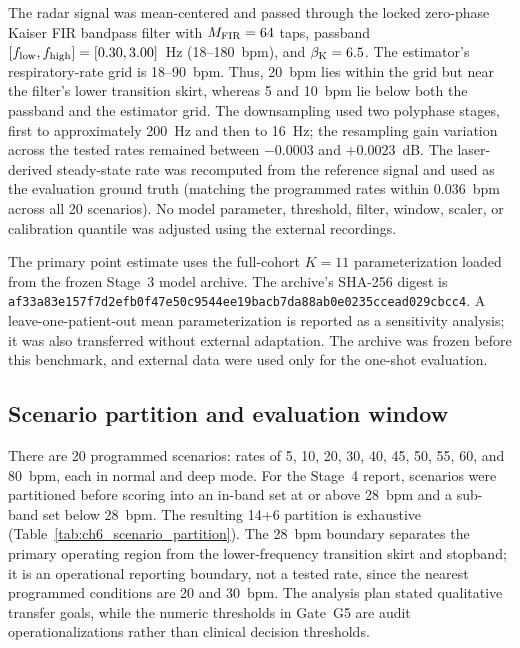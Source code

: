 The radar signal was mean-centered and passed through the locked zero-phase Kaiser FIR bandpass filter with $M_{\mathrm{FIR}}=64$ taps, passband $[f_{\mathrm{low}},f_{\mathrm{high}}]=[0.30,3.00]$~Hz (18--180~bpm), and $\beta_{\mathrm{K}}=6.5$. The estimator's respiratory-rate grid is 18--90~bpm. Thus, 20~bpm lies within the grid but near the filter's lower transition skirt, whereas 5 and 10~bpm lie below both the passband and the estimator grid. The downsampling used two polyphase stages, first to approximately 200~Hz and then to 16~Hz; the resampling gain variation across the tested rates remained between $-0.0003$ and $+0.0023$~dB. The laser-derived steady-state rate was recomputed from the reference signal and used as the evaluation ground truth (matching the programmed rates within 0.036~bpm across all 20 scenarios). No model parameter, threshold, filter, window, scaler, or calibration quantile was adjusted using the external recordings.

The primary point estimate uses the full-cohort $K=11$ parameterization loaded from the frozen Stage~3 model archive. The archive's SHA-256 digest is \texttt{af33a83e\allowbreak 157f7d2e\allowbreak fb0f47e5\allowbreak 0c9544ee\allowbreak 19bacb7d\allowbreak a88ab0e0\allowbreak 235ccead\allowbreak 029cbcc4}. A leave-one-patient-out mean parameterization is reported as a sensitivity analysis; it was also transferred without external adaptation. The archive was frozen before this benchmark, and external data were used only for the one-shot evaluation.

\subsection{Scenario partition and evaluation window}

There are 20 programmed scenarios: rates of 5, 10, 20, 30, 40, 45, 50, 55, 60, and 80~bpm, each in normal and deep mode. For the Stage~4 report, scenarios were partitioned before scoring into an in-band set at or above 28~bpm and a sub-band set below 28~bpm. The resulting 14+6 partition is exhaustive (Table~\ref{tab:ch6_scenario_partition}). The 28~bpm boundary separates the primary operating region from the lower-frequency transition skirt and stopband; it is an operational reporting boundary, not a tested rate, since the nearest programmed conditions are 20 and 30~bpm. The analysis plan stated qualitative transfer goals, while the numeric thresholds in Gate~G5 are audit operationalizations rather than clinical decision thresholds.

